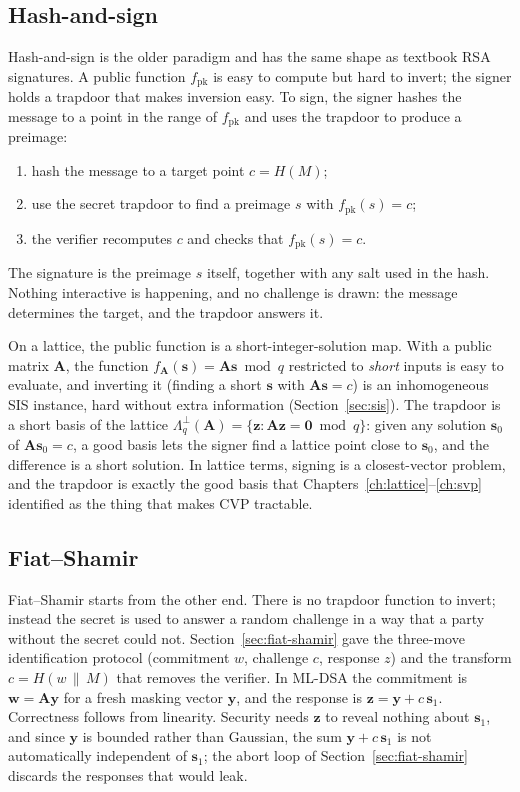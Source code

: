 \subsection{Hash-and-sign}

Hash-and-sign is the older paradigm and has the same shape as textbook RSA signatures. A public function $f_{\mathrm{pk}}$ is easy to compute but hard to invert; the signer holds a trapdoor that makes inversion easy. To sign, the signer hashes the message to a point in the range of $f_{\mathrm{pk}}$ and uses the trapdoor to produce a preimage:
\begin{enumerate}
  \item hash the message to a target point $c = H(M)$;
  \item use the secret trapdoor to find a preimage $s$ with $f_{\mathrm{pk}}(s) = c$;
  \item the verifier recomputes $c$ and checks that $f_{\mathrm{pk}}(s) = c$.
\end{enumerate}
The signature is the preimage $s$ itself, together with any salt used in the hash. Nothing interactive is happening, and no challenge is drawn: the message determines the target, and the trapdoor answers it.

On a lattice, the public function is a short-integer-solution map. With a public matrix $\mathbf{A}$, the function $f_{\mathbf{A}}(\mathbf{s}) = \mathbf{A}\mathbf{s} \bmod q$ restricted to \emph{short} inputs is easy to evaluate, and inverting it (finding a short $\mathbf{s}$ with $\mathbf{A}\mathbf{s} = c$) is an inhomogeneous SIS instance, hard without extra information (Section~\ref{sec:sis}). The trapdoor is a short basis of the lattice $\Lambda^{\perp}_q(\mathbf{A}) = \{\mathbf{z} : \mathbf{A}\mathbf{z} = \mathbf{0} \bmod q\}$: given any solution $\mathbf{s}_0$ of $\mathbf{A}\mathbf{s}_0 = c$, a good basis lets the signer find a lattice point close to $\mathbf{s}_0$, and the difference is a short solution. In lattice terms, signing is a closest-vector problem, and the trapdoor is exactly the good basis that Chapters~\ref{ch:lattice}--\ref{ch:svp} identified as the thing that makes CVP tractable.

\subsection{Fiat--Shamir}

Fiat--Shamir starts from the other end. There is no trapdoor function to invert; instead the secret is used to answer a random challenge in a way that a party without the secret could not. Section~\ref{sec:fiat-shamir} gave the three-move identification protocol (commitment $w$, challenge $c$, response $z$) and the transform $c = H(w \,\|\, M)$ that removes the verifier. In ML-DSA the commitment is $\mathbf{w} = \mathbf{A}\mathbf{y}$ for a fresh masking vector $\mathbf{y}$, and the response is $\mathbf{z} = \mathbf{y} + c\,\mathbf{s}_1$. Correctness follows from linearity. Security needs $\mathbf{z}$ to reveal nothing about $\mathbf{s}_1$, and since $\mathbf{y}$ is bounded rather than Gaussian, the sum $\mathbf{y} + c\,\mathbf{s}_1$ is not automatically independent of $\mathbf{s}_1$; the abort loop of Section~\ref{sec:fiat-shamir} discards the responses that would leak.

